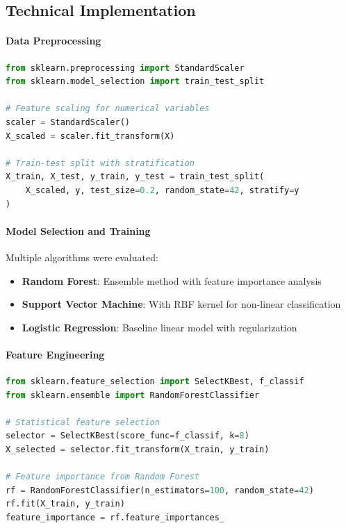 \documentclass[12pt, a4paper]{article}
\begin{document}
\subsection{Technical Implementation}

\paragraph{Data Preprocessing}
\begin{lstlisting}[language=Python, caption=Heart Disease Data Preprocessing]
from sklearn.preprocessing import StandardScaler
from sklearn.model_selection import train_test_split

# Feature scaling for numerical variables
scaler = StandardScaler()
X_scaled = scaler.fit_transform(X)

# Train-test split with stratification
X_train, X_test, y_train, y_test = train_test_split(
    X_scaled, y, test_size=0.2, random_state=42, stratify=y
)
\end{lstlisting}

\paragraph{Model Selection and Training}
Multiple algorithms were evaluated:
\begin{itemize}
    \item \textbf{Random Forest}: Ensemble method with feature importance analysis
    \item \textbf{Support Vector Machine}: With RBF kernel for non-linear classification
    \item \textbf{Logistic Regression}: Baseline linear model with regularization
\end{itemize}

\paragraph{Feature Engineering}
\begin{lstlisting}[language=Python, caption=Feature Selection Implementation]
from sklearn.feature_selection import SelectKBest, f_classif
from sklearn.ensemble import RandomForestClassifier

# Statistical feature selection
selector = SelectKBest(score_func=f_classif, k=8)
X_selected = selector.fit_transform(X_train, y_train)

# Feature importance from Random Forest
rf = RandomForestClassifier(n_estimators=100, random_state=42)
rf.fit(X_train, y_train)
feature_importance = rf.feature_importances_
\end{lstlisting}
\end{document}
